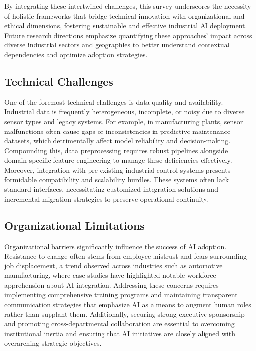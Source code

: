 \documentclass[sigconf]{acmart}
\begin{document}
By integrating these intertwined challenges, this survey underscores the necessity of holistic frameworks that bridge technical innovation with organizational and ethical dimensions, fostering sustainable and effective industrial AI deployment. Future research directions emphasize quantifying these approaches’ impact across diverse industrial sectors and geographies to better understand contextual dependencies and optimize adoption strategies.

\subsection{Technical Challenges}

One of the foremost technical challenges is data quality and availability. Industrial data is frequently heterogeneous, incomplete, or noisy due to diverse sensor types and legacy systems. For example, in manufacturing plants, sensor malfunctions often cause gaps or inconsistencies in predictive maintenance datasets, which detrimentally affect model reliability and decision-making. Compounding this, data preprocessing requires robust pipelines alongside domain-specific feature engineering to manage these deficiencies effectively. Moreover, integration with pre-existing industrial control systems presents formidable compatibility and scalability hurdles. These systems often lack standard interfaces, necessitating customized integration solutions and incremental migration strategies to preserve operational continuity.

\subsection{Organizational Limitations}

Organizational barriers significantly influence the success of AI adoption. Resistance to change often stems from employee mistrust and fears surrounding job displacement, a trend observed across industries such as automotive manufacturing, where case studies have highlighted notable workforce apprehension about AI integration. Addressing these concerns requires implementing comprehensive training programs and maintaining transparent communication strategies that emphasize AI as a means to augment human roles rather than supplant them. Additionally, securing strong executive sponsorship and promoting cross-departmental collaboration are essential to overcoming institutional inertia and ensuring that AI initiatives are closely aligned with overarching strategic objectives.
\end{document}
